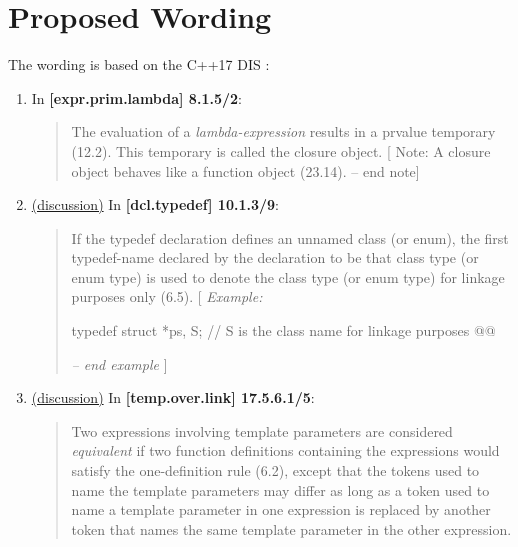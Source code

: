\documentclass{wg21}
\begin{document}
\section{Proposed Wording}
The wording is based on the C++17 DIS \cite{N4659}:

\begin{enumerate}
  \item \label{wording.remove}
    In \textbf{[expr.prim.lambda] 8.1.5/2}:
    \begin{quote}
      The evaluation of a \textit{lambda-expression} results in a prvalue
      temporary (12.2). This temporary is called the closure object.  [ Note: A closure object behaves like a function object
      (23.14). -- end note]
    \end{quote}

  \item \label{wording.non-template} \hyperref[discussion.non-template]{(discussion)}
    In \textbf{[dcl.typedef] 10.1.3/9}:
    \begin{quote}
      If the typedef declaration defines an unnamed class (or enum), the first
      typedef-name declared by the declaration to be that class type (or enum type)
      is used to denote the class type (or enum type) for linkage purposes only (6.5).
      [ \textit{Example:}
\begin{codeblock}
typedef struct { } *ps, S; // S is the class name for linkage purposes
@@
\end{codeblock}
      \textit{-- end example} ]
    \end{quote}
  \item \label{wording.template} \hyperref[discussion.template]{(discussion)}
    In \textbf{[temp.over.link] 17.5.6.1/5}:
    \begin{quote}
      Two expressions involving template parameters are considered \textit{equivalent}
      if two function definitions containing the expressions would satisfy the
      one-definition rule (6.2), except that the tokens used to name the template
      parameters may differ as long as a token used to name a template parameter
      in one expression is replaced by another token that names the same template
      parameter in the other expression. 
    \end{quote}


\end{enumerate}
\end{document}
